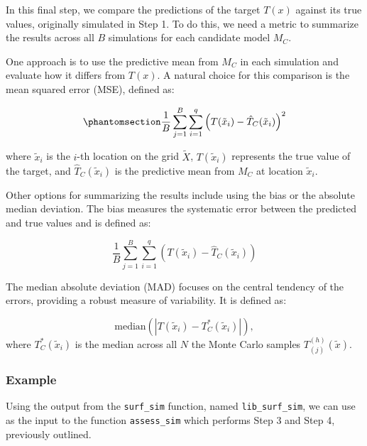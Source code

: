 \documentclass[
  letterpaper,
]{krantz}
\begin{document}
In this final step, we compare the predictions of the target \(T(x)\)
against its true values, originally simulated in Step 1. To do this, we
need a metric to summarize the results across all \(B\) simulations for
each candidate model \(M_C\).

One approach is to use the predictive mean from \(M_C\) in each
simulation and evaluate how it differs from \(T(x)\). A natural choice
for this comparison is the mean squared error (MSE), defined as:

\begin{equation}\phantomsection\label{eq-mse}{
\frac{1}{B} \sum_{j=1}^B \sum_{i=1}^q \left(T(\tilde{x}_i) - \hat{T}_{C}(\tilde{x}_i)\right)^2
}\end{equation}

where \(\tilde{x}_i\) is the \(i\)-th location on the grid
\(\tilde{X}\), \(T(\tilde{x}_i)\) represents the true value of the
target, and \(\hat{T}_{C}(\tilde{x}_i)\) is the predictive mean from
\(M_C\) at location \(\tilde{x}_i\).

Other options for summarizing the results include using the bias or the
absolute median deviation. The bias measures the systematic error
between the predicted and true values and is defined as:

\[
\frac{1}{B} \sum_{j=1}^B \sum_{i=1}^q \left(T(\tilde{x}_i) - \hat{T}_{C}(\tilde{x}_i)\right)
\]

The median absolute deviation (MAD) focuses on the central tendency of
the errors, providing a robust measure of variability. It is defined as:

\[
\text{median}\left(\left|T(\tilde{x}_i) - T^*_{C}(\tilde{x}_i)\right|\right),
\] where \(T^*_{C}(\tilde{x}_i)\) is the median across all \(N\) the
Monte Carlo samples \(T_{(j)}^{(h)}(\tilde{x})\).

\subsubsection{Example}\label{example-2}

Using the output from the \texttt{surf\_sim} function, named
\texttt{lib\_surf\_sim}, we can use as the input to the function
\texttt{assess\_sim} which performs Step 3 and Step 4, previously
outlined.
\end{document}

